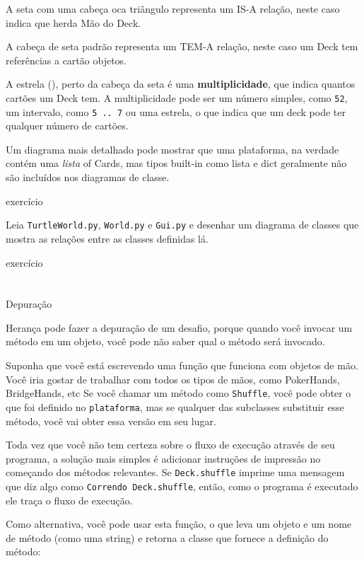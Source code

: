 \documentclass[10pt]{book}
\begin{document}
\begin{v erbatim}
{A seta com uma cabeça oca triângulo representa um IS-A
relação, neste caso indica que herda Mão
do Deck.

A cabeça de seta padrão representa um TEM-A
relação, neste caso um Deck tem referências a cartão
objetos.

A estrela ({\tt *}), perto da cabeça da seta é uma 
{\bf multiplicidade}, que indica quantos cartões um Deck tem.
A multiplicidade pode ser um número simples, como {\tt 52}, um intervalo,
como {\tt 5 .. 7} ou uma estrela, o que indica que um deck pode
ter qualquer número de cartões.

Um diagrama mais detalhado pode mostrar que uma plataforma, na verdade
contém uma {\em lista} of Cards, mas tipos built-in
como lista e dict geralmente não são incluídos nos diagramas de classe.

\begin{} exercício

Leia {\tt TurtleWorld.py}, {\tt World.py} e {\tt Gui.py}
e desenhar um diagrama de classes que mostra as relações entre
as classes definidas lá.

\end{} exercício


\section{} Depuração

Herança pode fazer a depuração de um desafio, porque quando você
invocar um método em um objeto, você pode não saber qual o método
será invocado.

Suponha que você está escrevendo uma função que funciona com objetos de mão.
Você iria gostar de trabalhar com todos os tipos de mãos, como
PokerHands, BridgeHands, etc Se você chamar um método como
{\tt Shuffle}, você pode obter o que foi definido no {\tt plataforma},
mas se qualquer das subclasses substituir esse método, você vai
obter essa versão em seu lugar.  

Toda vez que você não tem certeza sobre o fluxo de execução através de seu
programa, a solução mais simples é adicionar instruções de impressão no
começando dos métodos relevantes. Se {\tt Deck.shuffle} imprime uma
mensagem que diz algo como {\tt Correndo Deck.shuffle}, então, como
o programa é executado ele traça o fluxo de execução.

Como alternativa, você pode usar esta função, o que leva um
objeto e um nome de método (como uma string) e retorna a classe que
fornece a definição do método:

}
\end{v erbatim}
\end{document}
